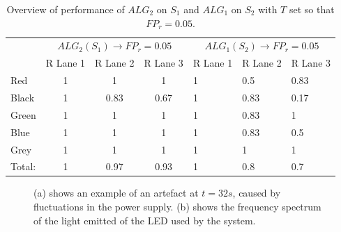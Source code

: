 \begin{table}[]
	\centering
	\begin{tabular}{l|ccc|lll}
	& \multicolumn{3}{c|}{$ALG_2(S_1) \rightarrow FP_r = 0.05$} & \multicolumn{3}{c}{$ALG_1(S_2) \rightarrow FP_r = 0.05$} \\
		& R Lane 1             & R Lane 2             & R Lane 3             & R Lane 1           & R Lane 2           & R Lane 3          \\ \hline
		Red    & 1                    & 1                    & 1                    & 1                  & 0.5                & 0.83              \\
		Black  & 1                    & 0.83                 & 0.67                 & 1                  & 0.83               & 0.17              \\
		Green  & 1                    & 1                    & 1                    & 1                  & 0.83               & 1                 \\
		Blue   & 1                    & 1                    & 1                    & 1                  & 0.83               & 0.5               \\
		Grey   & 1                    & 1                    & 1                    & 1                  & 1                  & 1                 \\ \hline
		Total: & 1                    & 0.97                 & 0.93                 & 1                  & 0.8                & 0.7              
	\end{tabular}
	\caption{Overview of performance of $ALG_2$ on $S_1$ and $ALG_1$ on $S_2$ with $T$ set so that $FP_r = 0.05$.\label{tbl:P=0.95}}
\end{table}

\begin{figure}
	\centering     %
	\caption{(a) shows an example of an artefact at $t = 32s$, caused by fluctuations in the power supply. (b) shows the frequency spectrum of the light emitted of the LED used by the system.\label{fig:explanations}}
\end{figure}

